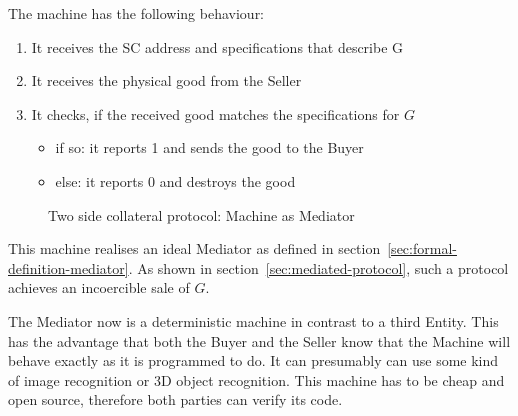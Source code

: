 \documentclass{cacthesis}
\newcommand{\authnote}[3]{{ \footnotesize \textbf{#1[#2: #3]~}}}
\newcommand{\niknote}[1]{\authnote{\color{red}}{Nikos}{#1}}
\begin{document}
The machine has the following behaviour:
\begin{enumerate}
    \item It receives the SC address and specifications that describe G
    \item It receives the physical good from the Seller
    \item It checks, if the received good matches the specifications for $G$
        \begin{itemize}
            \item if so: it reports 1 and sends the good to the Buyer
            \item else: it reports 0 and destroys the good
        \end{itemize}
\end{enumerate}

\begin{figure}[htb!]
    \centering
    \caption{Two side collateral protocol: Machine as Mediator}
    \label{pro:two-side-collateral-machine}
\end{figure}

This machine realises an ideal Mediator as defined in section~\ref{sec:formal-definition-mediator}. As shown in section~\ref{sec:mediated-protocol}, such a protocol achieves an incoercible sale of $G$.\newline

The Mediator now is a deterministic machine in contrast to a third Entity. This has the advantage that both the Buyer and the Seller know that the Machine will behave exactly as it is programmed to do. It can presumably can use some kind of image recognition or 3D object recognition. %
This machine has to be cheap and open source, therefore both parties can verify its code.\newline 
\end{document}
